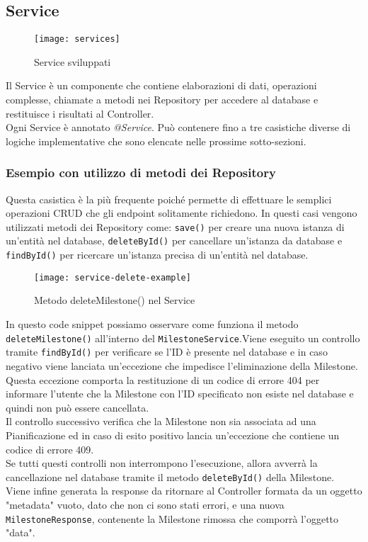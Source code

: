 \subsection{Service}
\begin{figure}[H] 
    \centering 
    \texttt{[image: services]} 
    \caption{Service sviluppati}
\end{figure}
Il Service è un componente che contiene elaborazioni di dati, operazioni complesse, chiamate a metodi nei Repository per accedere al database e restituisce i risultati al Controller.\\
Ogni Service è annotato \textit{@Service}. Può contenere fino a tre casistiche diverse di logiche implementative che sono elencate nelle prossime sotto-sezioni.

\subsubsection{Esempio con utilizzo di metodi dei Repository}
Questa casistica è la più frequente poiché permette di effettuare le semplici operazioni CRUD che gli endpoint solitamente richiedono. In questi casi vengono utilizzati metodi dei Repository come: \texttt{save()} per creare una nuova istanza di un'entità nel database, \texttt{deleteById()} per cancellare un'istanza da database e \texttt{findById()} per ricercare un'istanza precisa di un'entità nel database.
\begin{figure}[H] 
    \centering 
    \texttt{[image: service-delete-example]} 
    \caption{Metodo deleteMilestone() nel Service}
\end{figure}
\noindent In questo code snippet possiamo osservare come funziona il metodo \texttt{deleteMilestone()} all'interno del \texttt{MilestoneService}.Viene eseguito un controllo tramite \texttt{findById()} per verificare se l'ID è presente nel database e in caso negativo viene lanciata un'eccezione che impedisce l'eliminazione della Milestone. Questa eccezione comporta la restituzione di un codice di errore 404 per informare l'utente che la Milestone con l'ID specificato non esiste nel database e quindi non può essere cancellata.\\
Il controllo successivo verifica che la Milestone non sia associata ad una Pianificazione ed in caso di esito positivo lancia un'eccezione che contiene un codice di errore 409.\\
Se tutti questi controlli non interrompono l'esecuzione, allora avverrà la cancellazione nel database tramite il metodo \texttt{deleteById()} della Milestone.\\
Viene infine generata la response da ritornare al Controller formata da un oggetto "metadata" vuoto, dato che non ci sono stati errori, e una nuova \texttt{MilestoneResponse}, contenente la Milestone rimossa che comporrà l'oggetto "data".


